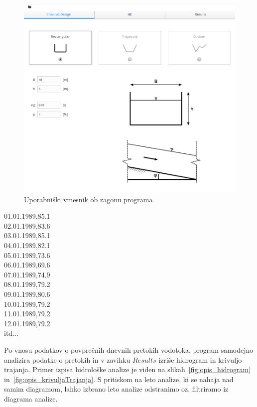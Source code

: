 \begin{figure}[htp!]
	\begin{centering}
		\includegraphics[width=\textwidth]{slike/opis/zagon_programa.png}\caption{Uporabniški vmesnik ob zagonu programa}\label{fig:opis_frontpage}
	\end{centering}
\end{figure}

\begin{center}
01.01.1989,85.1\\
02.01.1989,83.6\\
03.01.1989,85.1\\
04.01.1989,82.1\\
05.01.1989,73.6\\
06.01.1989,69.6\\
07.01.1989,74.9\\
08.01.1989,79.2\\
09.01.1989,80.6\\
10.01.1989,79.2\\
11.01.1989,79.2\\
12.01.1989,79.2\\
itd...\\
\end{center}

Po vnosu podatkov o povprečnih dnevnih pretokih vodotoka, program samodejno analizira podatke o pretokih in v zavihku $Results$ izriše hidrogram in krivuljo trajanja. Primer izpisa hidrološke analize je viden na slikah~\ref{fig:opis_hidrogram} in~\ref{fig:opis_krivuljaTrajanja}. S pritiskom na leto analize, ki se nahaja nad samim diagramom, lahko izbrano leto analize odstranimo oz. filtriramo iz diagrama analize.


